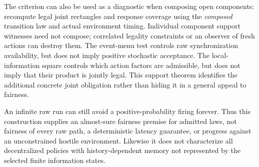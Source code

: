 \documentclass[11pt]{article}
\begin{document}
The criterion can also be used as a diagnostic when composing open components: recompute legal joint rectangles and response coverage using the \emph{composed} transition law and actual environment timing. Individual component support witnesses need not compose; correlated legality constraints or an observer of fresh actions can destroy them. The event-menu test controls raw synchronization availability, but does not imply positive stochastic acceptance. The local-information square controls which action factors are admissible, but does not imply that their product is jointly legal. This support theorem identifies the additional concrete joint obligation rather than hiding it in a general appeal to fairness.

An infinite raw run can still avoid a positive-probability firing forever. Thus this construction supplies an almost-sure fairness premise for admitted laws, not fairness of every raw path, a deterministic latency guarantee, or progress against an unconstrained hostile environment. Likewise it does not characterize all decentralized policies with history-dependent memory not represented by the selected finite information states.
\end{document}

